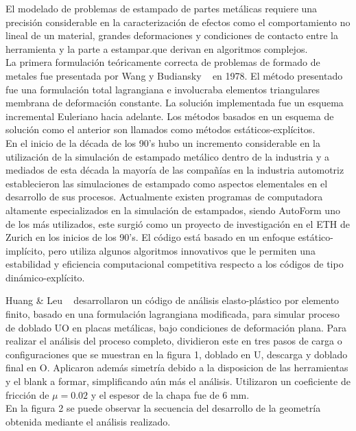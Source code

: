 El modelado de problemas de estampado de partes metálicas requiere una precisión considerable en la caracterización 
de efectos como el comportamiento no lineal de un material, grandes deformaciones y condiciones de contacto entre la
herramienta y la parte a estampar.que derivan  en algoritmos complejos.~\cite{banabic2000}\\

La primera formulación teóricamente correcta de problemas de formado de metales fue presentada por Wang y Budiansky 
~\cite{wang1978} en 1978. El método presentado fue una formulación total lagrangiana e involucraba elementos triangulares membrana de 
deformación constante. La solución implementada fue un esquema incremental Euleriano hacia adelante. Los métodos basados en un 
esquema de solución como el anterior son llamados como métodos estáticos-explícitos.\\

En el inicio de la década de los 90's hubo un incremento considerable en la utilización de la simulación de estampado 
metálico dentro de la industria y a mediados de esta década la mayoría de las compañías en la industria automotriz 
establecieron las simulaciones de estampado como aspectos elementales en el desarrollo de sus procesos. 
Actualmente existen programas de computadora altamente especializados en la simulación de estampados, siendo AutoForm 
uno de los más utilizados, este surgió como un proyecto de investigación en el ETH de Zurich en los inicios de los 90's. 
El código está basado en un enfoque estático-implícito, pero utiliza algunos algoritmos innovativos que le permiten 
una estabilidad y eficiencia computacional competitiva respecto a los códigos de tipo dinámico-explícito.~\cite{banabic2000}

Huang & Leu ~\cite{huang1995} desarrollaron un código de análisis elasto-plástico por elemento finito, basado en una formulación 
lagrangiana modificada, para simular proceso de doblado UO en placas metálicas, bajo condiciones de deformación 
plana. Para realizar el análisis del proceso completo, dividieron este en tres pasos de carga o configuraciones 
que se muestran en la figura 1, doblado en U, descarga y doblado final en O. Aplicaron además simetría debido a la 
disposicion de las herramientas y el blank a formar, simplificando aún más el análisis. Utilizaron un coeficiente 
de fricción de $\mu = 0.02$ y el espesor de la chapa fue de 6 mm.\\

En la figura 2 se puede observar la secuencia del desarrollo de la geometría obtenida mediante el análisis 
realizado. 


